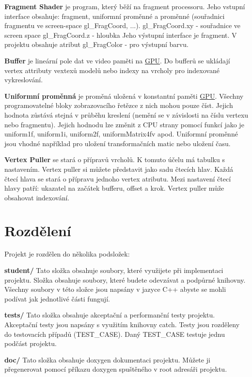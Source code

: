 {\bfseries Fragment Shader} je program, který běží na fragment processoru. Jeho vstupní interface obsahuje\+: fragment, uniformní proměnné a proměnné (souřadnici fragmentu ve screen-\/space gl\+\_\+\+Frag\+Coord, ...). gl\+\_\+\+Frag\+Coord.\+xy -\/ souřadnice ve screen space gl\+\_\+\+Frag\+Coord.\+z -\/ hloubka Jeho výstupní interface je fragment. V projektu obsahuje atribut gl\+\_\+\+Frag\+Color -\/ pro výstupní barvu.

{\bfseries Buffer} je lineární pole dat ve video paměti na \hyperlink{classGPU}{G\+PU}. Do bufferů se ukládají vertex attributy vextexů modelů nebo indexy na vrcholy pro indexované vykreslování.

{\bfseries Uniformní proměnná} je proměná uložená v konstantní paměti \hyperlink{classGPU}{G\+PU}. Všechny programovatelné bloky zobrazovacího řetězce z nich mohou pouze číst. Jejich hodnota zůstává stejná v průběhu kreslení (nemění se v závislosti na číslu vertexu nebo fragmentu). Jejich hodnodu lze změnit z C\+PU strany pomocí funkcí jako je uniform1f, uniform1i, uniform2f, uniform\+Matrix4fv apod. Uniformní proměnné jsou vhodné například pro uložení transformačních matic nebo uložení času.

{\bfseries Vertex Puller} se stará o přípravů vrcholů. K tomuto účelu má tabulku s nastavením. Vertex puller si můžete představit jako sadu čtecích hlav. Každá čtecí hlava se stará o přípravu jednoho vertex atributu. Mezi nastavení čtecí hlavy patří\+: ukazatel na začátek bufferu, offset a krok. Vertex puller může obsahovat indexování.\hypertarget{index_rozdeleni}{}\section{Rozdělení}\label{index_rozdeleni}
Projekt je rozdělen do několika podsložek\+:

{\bfseries student/} Tato složka obsahuje soubory, které využijete při implementaci projektu. Složka obsahuje soubory, které budete odevzávat a podpůrné knihovny. Všechny soubory v této složce jsou napsány v jazyce C++ abyste se mohli podívat jak jednotlivé části fungují.

{\bfseries tests/} Tato složka obsahuje akceptační a performanční testy projektu. Akceptační testy jsou napsány s využitím knihovny catch. Testy jsou rozděleny do testovacích případů (T\+E\+S\+T\+\_\+\+C\+A\+SE). Daný T\+E\+S\+T\+\_\+\+C\+A\+SE testuje jednu podčást projektu.

{\bfseries doc/} Tato složka obsahuje doxygen dokumentaci projektu. Můžete ji přegenerovat pomocí příkazu doxygen spuštěného v root adresáři projektu.

